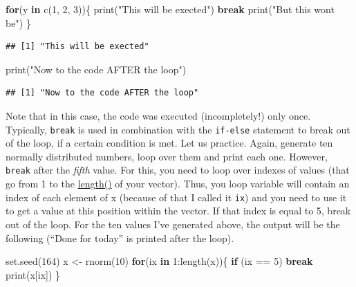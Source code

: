 \documentclass[
]{book}
\newenvironment{Shaded}{\begin{snugshade}}{\end{snugshade}}
\newcommand{\ControlFlowTok}[1]{\textcolor[rgb]{0.13,0.29,0.53}{\textbf{#1}}}
\newcommand{\DecValTok}[1]{\textcolor[rgb]{0.00,0.00,0.81}{#1}}
\newcommand{\FunctionTok}[1]{\textcolor[rgb]{0.00,0.00,0.00}{#1}}
\newcommand{\NormalTok}[1]{#1}
\newcommand{\OtherTok}[1]{\textcolor[rgb]{0.56,0.35,0.01}{#1}}
\newcommand{\SpecialCharTok}[1]{\textcolor[rgb]{0.00,0.00,0.00}{#1}}
\newcommand{\StringTok}[1]{\textcolor[rgb]{0.31,0.60,0.02}{#1}}
\begin{document}
\begin{Shaded}
\begin{Highlighting}[]
\ControlFlowTok{for}\NormalTok{(y }\ControlFlowTok{in} \FunctionTok{c}\NormalTok{(}\DecValTok{1}\NormalTok{, }\DecValTok{2}\NormalTok{, }\DecValTok{3}\NormalTok{))\{}
  \FunctionTok{print}\NormalTok{(}\StringTok{"This will be exected"}\NormalTok{)}
  \ControlFlowTok{break}
  \FunctionTok{print}\NormalTok{(}\StringTok{"But this won\textquotesingle{}t be"}\NormalTok{)}
\NormalTok{\}}
\end{Highlighting}
\end{Shaded}

\begin{verbatim}
## [1] "This will be exected"
\end{verbatim}

\begin{Shaded}
\begin{Highlighting}[]
\FunctionTok{print}\NormalTok{(}\StringTok{"Now to the code AFTER the loop"}\NormalTok{)}
\end{Highlighting}
\end{Shaded}

\begin{verbatim}
## [1] "Now to the code AFTER the loop"
\end{verbatim}

Note that in this case, the code was executed (incompletely!) only once. Typically, \texttt{break} is used in combination with the \texttt{if-else} statement to break out of the loop, if a certain condition is met. Let us practice. Again, generate ten normally distributed numbers, loop over them and print each one. However, \texttt{break} after the \emph{fifth} value. For this, you need to loop over indexes of values (that go from 1 to the \href{https://stat.ethz.ch/R-manual/R-devel/library/base/html/length.html}{length()} of your vector). Thus, you loop variable will contain an index of each element of x (because of that I called it \texttt{ix}) and you need to use it to get a value at this position within the vector. If that index is equal to 5, break out of the loop.
For the ten values I've generated above, the output will be the following (``Done for today'' is printed after the loop).

\begin{Shaded}
\begin{Highlighting}[]
\FunctionTok{set.seed}\NormalTok{(}\DecValTok{164}\NormalTok{)}
\NormalTok{x }\OtherTok{\textless{}{-}} \FunctionTok{rnorm}\NormalTok{(}\DecValTok{10}\NormalTok{)}
\ControlFlowTok{for}\NormalTok{(ix }\ControlFlowTok{in} \DecValTok{1}\SpecialCharTok{:}\FunctionTok{length}\NormalTok{(x))\{}
  \ControlFlowTok{if}\NormalTok{ (ix }\SpecialCharTok{==} \DecValTok{5}\NormalTok{)  }\ControlFlowTok{break}
  \FunctionTok{print}\NormalTok{(x[ix])}
\NormalTok{\}}
\end{Highlighting}
\end{Shaded}
\end{document}
